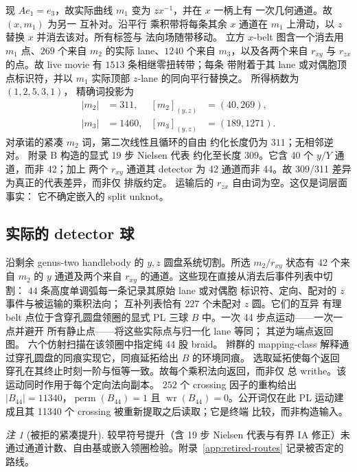 \documentclass[11pt]{amsart}
\theoremstyle{definition}
\theoremstyle{remark}
\newtheorem{remark}[theorem]{注}
\begin{document}
现 $Ae_1=e_3$，故实际曲线 $m_1$ 变为 $zx^{-1}$，并在 $x$ 一柄上有
一次几何通道。故 $(x,m_1)$ 为另一
互补对。沿平行
乘积带将每条其余 $x$ 通道在 $m_1$ 上滑动，以 $z$ 替换 $x$ 并消去该对。所有标签与
法向场随带移动。
立方 $x$-belt 图含一个消去用 $m_1$ 点、$269$ 个来自 $m_2$ 的实际
lane、$1240$ 个来自 $m_3$，以及各两个来自 $r_{xy}$ 与
$r_{zx}$ 的点。故 live movie 有 $1513$ 条相继零扭转带；每条
带附着于其 lane 或对偶胞顶点标识符，并以 $m_1$ 实际顶部 $z$-lane 的同向平行替换之。
所得柄数为 $(1,2,5,3,1)$，
精确词投影为
\[
\begin{aligned}
|m_2|&=311, & [m_2]_{(y,z)}&=(40,269),\\
|m_3|&=1460, & [m_3]_{(y,z)}&=(189,1271).
\end{aligned}
\]
对承诺的紧凑 $m_2$ 词，第二次线性且循环的自由
约化长度仍为 $311$；无相邻逆对。
附录 B 构造的显式 19 步 Nielsen 代表
约化至长度 $309$。它含 40 个 $y/Y$ 通道，而非 42；加上
两个 $r_{xy}$ 通道其 detector 为 42 通道而非 44。故
309/311 差异为真正的代表差异，而非仅
排版约定。
运输后的 $r_{zx}$ 自由词为空。这仅是词层面事实：
它不确定嵌入的 split unknot。

\subsection{实际的 detector 球}

沿剩余 genus-two handlebody 的 $y,z$ 圆盘系统切割。所选
$m_2/r_{xy}$ 状态有 42 个来自 $m_2$ 的 $y$ 通道及两个来自
$r_{xy}$ 的通道。这些现在直接从消去后事件列表中切割：
$44$ 条高度单调弧每一条记录其原始 lane 或对偶胞
标识符、定向、配对的 $z$ 事件与被运输的乘积法向；
互补列表恰有 $227$ 个未配对 $z$ 圆。它们的互异
有理 belt 点位于含穿孔圆盘领圈的显式 PL 三球 $B$ 中。一次 44 步点运动——一次一点并避开
所有静止点——将这些实际点与归一化 lane 等同；
其逆为端点返回图。
六个仿射扫描在该领圈中指定纯 44 股 braid。
辫群的 mapping-class 解释通过穿孔圆盘的同痕实现它，同痕延拓给出 $B$ 的环境同痕。
选取延拓使每个返回
穿孔在其终止时刻一阶与恒等一致。故每个乘积法向返回，而非仅
总 writhe。该运动同时作用于每个定向法向副本。
$252$ 个 crossing 因子的重构给出
$|B_{44}|=11340$，$\operatorname{perm}(B_{44})=1$ 且
$\operatorname{wr}(B_{44})=0$。公开词仅在此 PL
运动建成且其 11340 个 crossing 被重新提取之后读取；它是终端
比较，而非构造输入。

\begin{remark}[被拒的紧凑提升]
较早符号提升（含 19 步 Nielsen 代表与有界 IA 修正）未通过通道计数、自由基或嵌入领圈检验。附录~\ref{app:retired-routes} 记录被否定的路线。
\end{remark}
\end{document}
